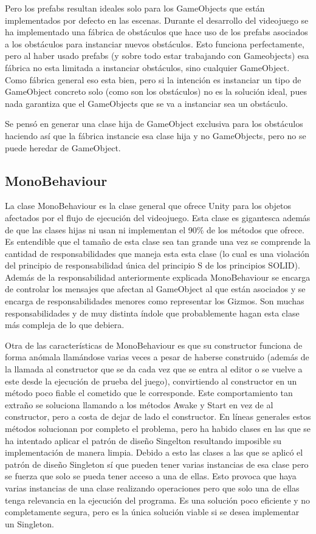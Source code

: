 Pero los prefabs resultan ideales solo para los GameObjects que están implementados por defecto en las escenas. Durante el desarrollo del videojuego se ha implementado una fábrica de obstáculos que hace uso de los prefabs asociados a los obstáculos para instanciar nuevos obstáculos. Esto funciona perfectamente, pero al haber usado prefabs (y sobre todo estar trabajando con Gameobjects) esa fábrica no esta limitada a instanciar obstáculos, sino cualquier GameObject. Como fábrica general eso esta bien, pero si la intención es instanciar un tipo de GameObject concreto solo (como son los obstáculos) no es la solución ideal, pues nada garantiza que el GameObjects que se va a instanciar sea un obstáculo.

Se pensó en generar una clase hija de GameObject exclusiva para los obstáculos haciendo así que la fábrica instancie esa clase hija y no GameObjects, pero no se puede heredar de GameObject.

\subsection{MonoBehaviour}
La clase MonoBehaviour es la clase general que ofrece Unity para los objetos afectados por el flujo de ejecución del videojuego. Esta clase es gigantesca además de que las clases hijas ni usan ni implementan el 90\% de los métodos que ofrece. Es entendible que el tamaño de esta clase sea tan grande una vez se comprende la cantidad de responsabilidades que maneja esta esta clase (lo cual es una violación del principio de responsabilidad única del principio S de los principios SOLID). Además de la responsabilidad anteriormente explicada MonoBehaviour se encarga de controlar los mensajes que afectan al GameObject al que están asociados y se encarga de responsabilidades menores como representar los Gizmos. Son muchas responsabilidades y de muy distinta índole que probablemente hagan esta clase más compleja de lo que debiera.

Otra de las características de MonoBehaviour es que su constructor funciona de forma anómala \cite{ConstructoresMonoBehaviour} llamándose varias veces a pesar de haberse construido (además de la llamada al constructor que se da cada vez que se entra al editor o se vuelve a este desde la ejecución de prueba del juego), convirtiendo al constructor en un método poco fiable el cometido que le corresponde. Este comportamiento tan extraño se soluciona llamando a los métodos Awake y Start en vez de al constructor, pero a costa de dejar de lado el constructor. En líneas generales estos métodos solucionan por completo el problema, pero ha habido clases en las que se ha intentado aplicar el patrón de diseño Singelton resultando imposible su implementación de manera limpia. Debido a esto las clases a las que se aplicó el patrón de diseño Singleton sí que pueden tener varias instancias de esa clase pero se fuerza que solo se pueda tener acceso a una de ellas. Esto provoca que haya varias instancias de una clase realizando operaciones pero que solo una de ellas tenga relevancia en la ejecución del programa. Es una solución poco eficiente y no completamente segura, pero es la única solución viable si se desea implementar un Singleton.

